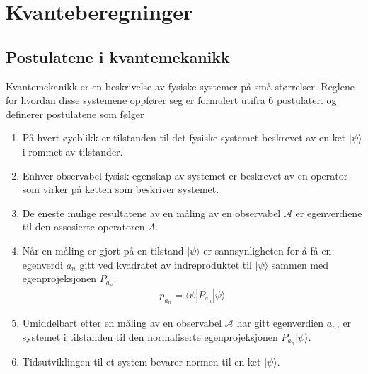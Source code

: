 \section{Kvanteberegninger}




    \subsection{Postulatene i kvantemekanikk}

        Kvantemekanikk er en beskrivelse av fysiske systemer på små størrelser. Reglene for hvordan disse systemene oppfører seg er formulert utifra 6 postulater. \cite{Jaffe_2007} og \cite{portugal_2019} definerer postulatene som følger
        \begin{enumerate}
            \item På hvert øyeblikk er tilstanden til det fysiske systemet beskrevet av en ket $|\psi\rangle$ i rommet av tilstander.
            \item Enhver observabel fysisk egenskap av systemet er beskrevet av en operator som virker på ketten som beskriver systemet.
            \item De eneste mulige resultatene av en måling av en observabel $\mathcal{A}$ er egenverdiene til den assosierte operatoren $A$.
            \item Når en måling er gjort på en tilstand $|\psi\rangle$ er sannsynligheten for å få en egenverdi $a_n$ gitt ved kvadratet av indreproduktet til $|\psi\rangle$ sammen med egenprojeksjonen $P_{a_n}$.
            \begin{align*}
                p_{a_n} = \langle \psi|P_{a_n}|\psi\rangle
            \end{align*}
            \item Umiddelbart etter en måling av en observabel $\mathcal{A}$ har gitt egenverdien $a_n$, er systemet i tilstanden til den normaliserte egenprojeksjonen $P_{a_n}|\psi\rangle$.
            \item Tidsutviklingen til et system bevarer normen til en ket $|\psi\rangle$.
        \end{enumerate}

